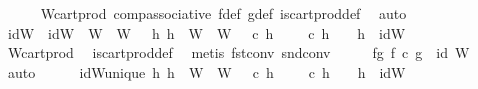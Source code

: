\begin{isabellebody}
\ \ \ \ \isamarkupfalse%
\ W{\isacharprime}{\kern0pt}{\isacharunderscore}{\kern0pt}cart{\isacharunderscore}{\kern0pt}prod\ comp{\isacharunderscore}{\kern0pt}associative{}\ f{\isacharunderscore}{\kern0pt}def\ g{\isacharunderscore}{\kern0pt}def\ is{\isacharunderscore}{\kern0pt}cart{\isacharunderscore}{\kern0pt}prod{\isacharunderscore}{\kern0pt}def\ \isamarkupfalse%
\ auto\isanewline
\isanewline
\ \ \isamarkupfalse%
\ idW{\isacharprime}{\kern0pt}\ \ {\isachardoublequoteopen}idW{\isacharprime}{\kern0pt}\ {\isacharcolon}{\kern0pt}\ W{\isacharprime}{\kern0pt}\ {\isasymrightarrow}\ W{\isacharprime}{\kern0pt}\ {\isasymand}\ {\isacharparenleft}{\kern0pt}{\isasymforall}\ h{}{\isachardot}{\kern0pt}\ {\isacharparenleft}{\kern0pt}h{}\ {\isacharcolon}{\kern0pt}\ W{\isacharprime}{\kern0pt}\ {\isasymrightarrow}\ W{\isacharprime}{\kern0pt}\ {\isasymand}\ {\isasympi}{\isacharprime}{\kern0pt}\ {\isasymcirc}\isactrlsub c\ h{}\ {\isacharequal}{\kern0pt}\ {\isasympi}{\isacharprime}{\kern0pt}\ {\isasymand}\ {\isasympi}{\isacharprime}{\kern0pt}\ {\isasymcirc}\isactrlsub c\ h{}\ {\isacharequal}{\kern0pt}\ {\isasympi}{\isacharprime}{\kern0pt}\ {\isasymlongrightarrow}\ h{}\ {\isacharequal}{\kern0pt}\ idW{\isacharprime}{\kern0pt}{\isacharparenright}{\kern0pt}{\isachardoublequoteclose}\isanewline
\ \ \ \ \isamarkupfalse%
\ W{\isacharprime}{\kern0pt}{\isacharunderscore}{\kern0pt}cart{\isacharunderscore}{\kern0pt}prod\ \isamarkupfalse%
\ is{\isacharunderscore}{\kern0pt}cart{\isacharunderscore}{\kern0pt}prod{\isacharunderscore}{\kern0pt}def\ \isamarkupfalse%
\ {\isacharparenleft}{\kern0pt}metis\ fst{\isacharunderscore}{\kern0pt}conv\ snd{\isacharunderscore}{\kern0pt}conv{\isacharparenright}{\kern0pt}\isanewline
\ \ \isamarkupfalse%
\ \isamarkupfalse%
\ fg{\isacharcolon}{\kern0pt}\ {\isachardoublequoteopen}f\ {\isasymcirc}\isactrlsub c\ g\ {\isacharequal}{\kern0pt}\ id\ W{\isacharprime}{\kern0pt}{\isachardoublequoteclose}\isanewline
\ \ \isamarkupfalse%
\ auto\isanewline
\ \ \ \ \isamarkupfalse%
\ idW{\isacharprime}{\kern0pt}{\isacharunderscore}{\kern0pt}unique{\isacharcolon}{\kern0pt}\ {\isachardoublequoteopen}{\isasymforall}h{}{\isachardot}{\kern0pt}\ h{}\ {\isacharcolon}{\kern0pt}\ W{\isacharprime}{\kern0pt}\ {\isasymrightarrow}\ W{\isacharprime}{\kern0pt}\ {\isasymand}\ {\isasympi}{\isacharprime}{\kern0pt}\ {\isasymcirc}\isactrlsub c\ h{}\ {\isacharequal}{\kern0pt}\ {\isasympi}{\isacharprime}{\kern0pt}\ {\isasymand}\ {\isasympi}{\isacharprime}{\kern0pt}\ {\isasymcirc}\isactrlsub c\ h{}\ {\isacharequal}{\kern0pt}\ {\isasympi}{\isacharprime}{\kern0pt}\ {\isasymlongrightarrow}\ h{}\ {\isacharequal}{\kern0pt}\ idW{\isacharprime}{\kern0pt}{\isachardoublequoteclose}\isanewline

\end{isabellebody}

